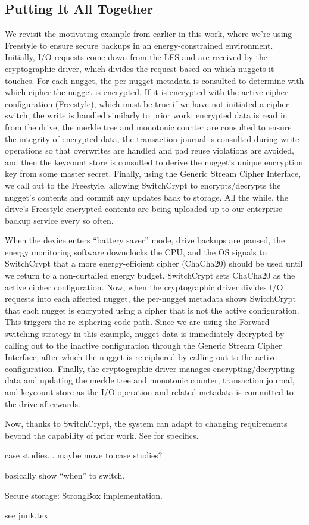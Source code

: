 

\subsection{Putting It All Together} \label{subsec:summary}

We revisit the motivating example from earlier in this work, where we're using
Freestyle to ensure secure backups in an energy-constrained environment.
Initially, I/O requests come down from the LFS and are received by the
cryptographic driver, which divides the request based on which nuggets it
touches. For each nugget, the per-nugget metadata is consulted to determine with
which cipher the nugget is encrypted. If it is encrypted with the active cipher
configuration (Freestyle), which must be true if we have not initiated a cipher
switch, the write is handled similarly to prior work: encrypted data is read in
from the drive, the merkle tree and monotonic counter are consulted to ensure
the integrity of encrypted data, the transaction journal is consulted during
write operations so that overwrites are handled and pad reuse violations are
avoided, and then the keycount store is consulted to derive the nugget's unique
encryption key from some master secret. Finally, using the Generic Stream Cipher
Interface, we call out to the Freestyle, allowing SwitchCrypt to
encrypts/decrypts the nugget's contents and commit any updates back to storage.
All the while, the drive's Freestyle-encrypted contents are being uploaded up to
our enterprise backup service every so often.

When the device enters ``battery saver'' mode, drive backups are paused, the
energy monitoring software downclocks the CPU, and the OS signals to SwitchCrypt
that a more energy-efficient cipher (ChaCha20) should be used until we return to
a non-curtailed energy budget. SwitchCrypt sets ChaCha20 as the active cipher
configuration. Now, when the cryptographic driver divides I/O requests into each
affected nugget, the per-nugget metadata shows SwitchCrypt that each nugget is
encrypted using a cipher that is not the active configuration. This triggers the
re-ciphering code path. Since we are using the Forward switching strategy in
this example, nugget data is immediately decrypted by calling out to the
inactive configuration through the Generic Stream Cipher Interface, after which
the nugget is re-ciphered by calling out to the active configuration. Finally,
the cryptographic driver manages encrypting/decrypting data and updating the
merkle tree and monotonic counter, transaction journal, and keycount store as
the I/O operation and related metadata is committed to the drive afterwards.

Now, thanks to SwitchCrypt, the system can adapt to changing requirements beyond
the capability of prior work. See  for specifics.


case studies...
maybe move to case studies?

basically show ``when'' to switch.





Secure storage:
StrongBox implementation.

see junk.tex

